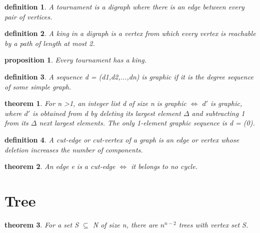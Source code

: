 \documentclass[2pt]{article}
\newtheorem{theorem}{theorem}[section]  %
\newtheorem{definition}{definition}
\newtheorem{proposition}{proposition}
\begin{document}
\begin{CJK*}{UTF8}{bkai}
\begin{paracol}{2}
    \begin{definition}
        A tournament is a digraph where there is an edge between every pair of
 vertices.
    \end{definition}

    \begin{definition}
         A king in a digraph is a vertex from which every vertex is reachable by a path
 of length at most 2.
    \end{definition}

    \begin{proposition}
        Every tournament has a king.
    \end{proposition}

    \begin{definition}
         A sequence d = (d1,d2,...,dn) is graphic if it is the degree sequence of some
 simple graph.
    \end{definition}

    \begin{theorem}
         For n >1, an integer list d of size n is graphic $\iff$ $d\prime$ is graphic, where $d\prime$ is
 obtained from d by deleting its largest element $\Delta$ and subtracting 1 from its $\Delta$
 next largest elements. The only 1-element graphic sequence is d = (0).
    \end{theorem}

    \begin{definition}
         A cut-edge or cut-vertex of a graph is an edge or vertex whose deletion
 increases the number of components.
    \end{definition}

    \begin{theorem}
        An edge e is a cut-edge $\iff$ it belongs to no cycle.
    \end{theorem}

    
    
\end{paracol}
\vspace{2cm} %

\section*{Tree}
\begin{paracol}{2} %
    \switchcolumn[0]

    \begin{theorem}
         For a set S $\subseteq$ N of size n, there are $n^{n-2}$ trees with vertex set S.
    \end{theorem}


\end{paracol}
\end{CJK*}
\end{document}

